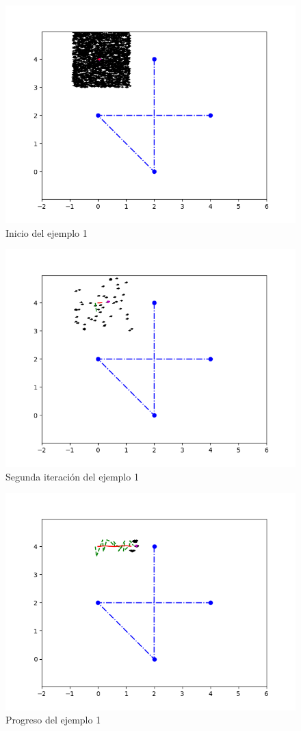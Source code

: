 \begin{figure}[htb]
  \centering
  \includegraphics[width=.8\linewidth]{images/filtro1.png}
  \caption{Inicio del ejemplo 1}
  \label{fig:ejemplo1}
\end{figure}
\begin{figure}[htb]
  \centering
  \includegraphics[width=.8\linewidth]{images/filtro2.png}
  \caption{Segunda iteración del ejemplo 1}
  \label{fig:ejemplo2}
\end{figure}
\begin{figure}[htb]
  \centering
  \includegraphics[width=.8\linewidth]{images/filtro3.png}
  \caption{Progreso del ejemplo 1}
  \label{fig:ejemplo3}
\end{figure}
